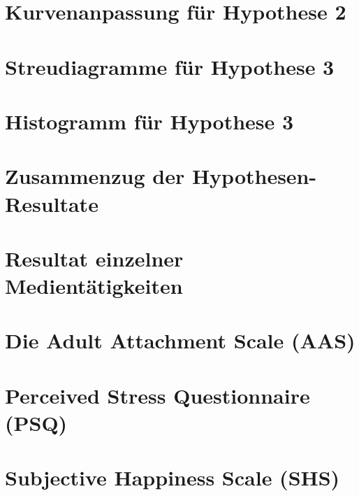 \section{Kurvenanpassung für Hypothese 2}\label{app:Hypo2_Kurvenanpassung}

\newpage
\section{Streudiagramme für Hypothese 3}\label{app:Hypo3_Streudiagramm}

\newpage
\section{Histogramm für Hypothese 3}\label{app:Hypo3_Histogramm}

\newpage

\section{Zusammenzug der Hypothesen-Resultate}\label{app:ZusammenzugResultate}

\newpage

\section{Resultat einzelner Medientätigkeiten}\label{app:ResultateMedientaetigkeiten}

\newpage



\section{Die Adult Attachment Scale (AAS)}\label{app:AAS}

\newpage

\section{Perceived Stress Questionnaire (PSQ)}\label{app:PSQ}

\newpage

\section{Subjective Happiness Scale (SHS)}\label{app:SHS}

\newpage

